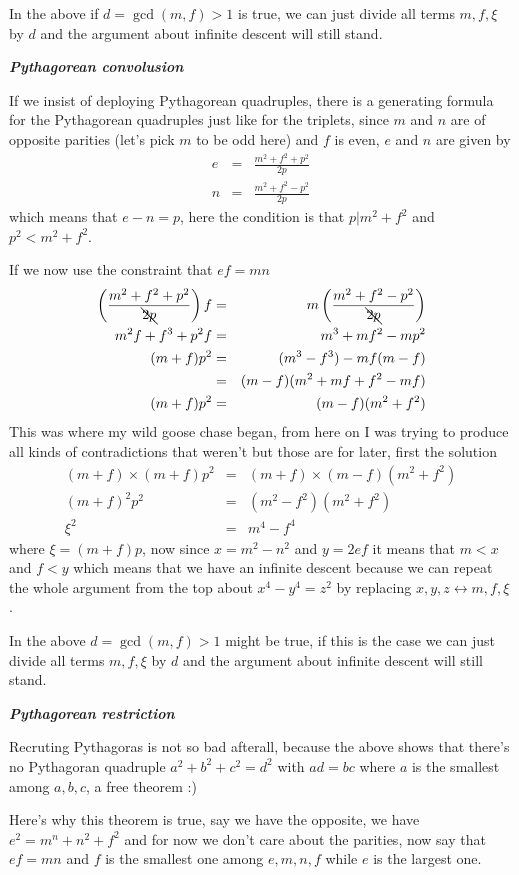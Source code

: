 \documentclass[aps,preprint,preprintnumbers,nofootinbib,showpacs,prd]{revtex4-1}
\newcommand{\nbea}{\begin{eqnarray*}}
\newcommand{\neea}{\end{eqnarray*}}
\begin{document}
In the above if $d = \gcd(m,f)>1$ is true, we can just divide all terms $m,f,\xi$ by $d$ and the argument about infinite descent will still stand.

\bigskip
\textit{\textbf{Pythagorean convolusion}}
\smallskip

If we insist of deploying Pythagorean quadruples, there is a generating formula for the Pythagorean quadruples just like for the triplets, since $m$ and $n$ are of opposite parities (let's pick $m$ to be odd here) and $f$ is even, $e$ and $n$ are given by
%
\nbea
e & = & \frac{m^2 + f^2 + p^2}{2p} \\
n & = & \frac{m^2 + f^2 - p^2}{2p}
\neea
%
which means that $e - n = p$, here the condition is that $p | m^2 + f^2$ and $p^2 < m^2 + f^2$.

If we now use the constraint that $ef = mn$
%
\nbea
\left (\frac{m^2 + f^2 + p^2}{\bcancel{2p}} \right ) f & = & m \left ( \frac{m^2 + f^2 - p^2}{\bcancel{2p}} \right ) \\
m^2f + f^3 + p^2f & = & m^3 + mf^2 - mp^2 \\
(m + f)p^2 & = & (m^3 - f^3) - mf(m - f) \\
& = & (m-f)(m^2 + mf + f^2 - mf) \\
(m + f)p^2 & = & (m-f)(m^2+f^2)
\neea
%
This was where my wild goose chase began, from here on I was trying to produce all kinds of contradictions that weren't but those are for later, first the solution
%
\nbea
(m + f) \times (m + f)p^2 & = & (m + f) \times (m-f)(m^2+f^2) \\
(m + f)^2 p^2 & = & (m^2 - f^2)(m^2+f^2) \\
\xi^2 & = & m^4 - f^4
\neea
%
where $\xi = (m+f)p$, now since $x = m^2 - n^2$ and $y = 2ef$ it means that $m < x$ and $f < y$ which means that we have an infinite descent because we can repeat the whole argument from the top about $x^4-y^4=z^2$ by replacing $x,y,z \leftrightarrow m,f,\xi$.

In the above $d = \gcd(m,f)>1$ might be true, if this is the case we can just divide all terms $m,f,\xi$ by $d$ and the argument about infinite descent will still stand.

\bigskip
\textit{\textbf{Pythagorean restriction}}
\smallskip

Recruting Pythagoras is not so bad afterall, because the above shows that there's no Pythagoran quadruple $a^2 + b^2 + c^2 = d^2$ with $ad = bc$ where $a$ is the smallest among $a,b,c$, a free theorem :)

Here's why this theorem is true, say we have the opposite, we have $e^2 = m^n + n^2 + f^2$ and for now we don't care about the parities, now say that $ef = mn$ and $f$ is the smallest one among $e,m,n,f$ while $e$ is the largest one.
\end{document}
